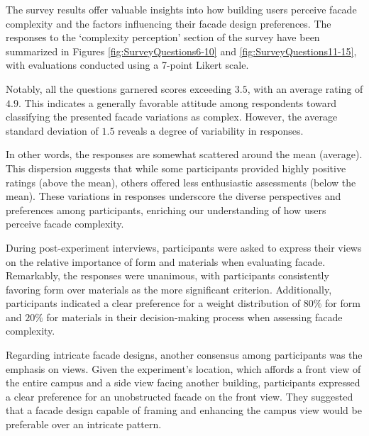 
The survey results offer valuable insights into how building users perceive facade complexity and the factors influencing their facade design preferences.
The responses to the `complexity perception' section of the survey have been summarized in Figures \ref{fig:SurveyQuestions6-10} and \ref{fig:SurveyQuestions11-15}, with evaluations conducted using a 7-point Likert scale.


Notably, all the questions garnered scores exceeding \(3.5\), with an average rating of \(4.9\).
This indicates a generally favorable attitude among respondents toward classifying the presented facade variations as complex.
However, the average standard deviation of \(1.5\) reveals a degree of variability in responses.

In other words, the responses are somewhat scattered around the mean (average).
This dispersion suggests that while some participants provided highly positive ratings (above the mean), others offered less enthusiastic assessments (below the mean).
These variations in responses underscore the diverse perspectives and preferences among participants, enriching our understanding of how users perceive facade complexity.






During post-experiment interviews, participants were asked to express their views on the relative importance of form and materials when evaluating facade.
Remarkably, the responses were unanimous, with participants consistently favoring form over materials as the more significant criterion.
Additionally, participants indicated a clear preference for a weight distribution of \(80\%\) for form and \(20\%\) for materials in their decision-making process when assessing facade complexity.

Regarding intricate facade designs, another consensus among participants was the emphasis on views.
Given the experiment's location, which affords a front view of the entire campus and a side view facing another building, participants expressed a clear preference for an unobstructed facade on the front view.
They suggested that a facade design capable of framing and enhancing the campus view would be preferable over an intricate pattern.

